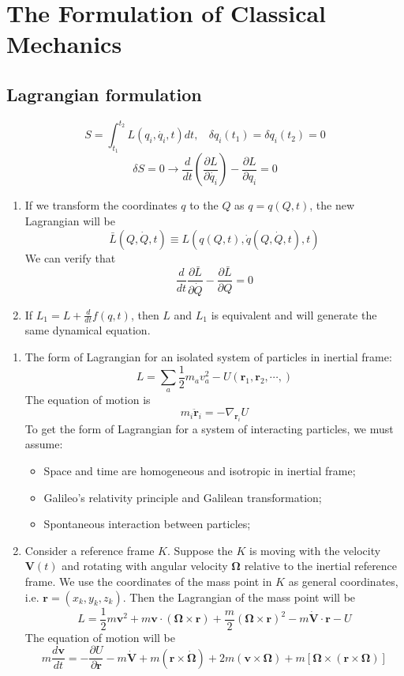 \chapter{The Formulation of Classical Mechanics}
\section{Lagrangian formulation}
\[S=\int_{t_1}^{t_2}L(q_i,\dot{q_i},t)dt, \ \ \ \ \delta q_i(t_1) = \delta q_i(t_2) = 0\]
\[\delta S=0 \rightarrow \frac{d}{dt}(\frac{\partial L}{\partial \dot{q_i}}) - \frac{\partial L}{\partial q_i}=0\]

\begin{enumerate}
\item If we transform the coordinates $q$ to the $Q$ as $q = q(Q,t)$, the new Lagrangian will be
\[\bar{L}(Q,\dot{Q},t) \equiv L(q(Q,t),\dot{q}(Q,\dot{Q},t),t)\]
We can verify that
\[\frac{d}{dt}\frac{\partial \bar{L}}{\partial \dot{Q}} - \frac{\partial \bar{L}}{\partial Q} = 0\]
\item If $L_1 = L + \frac{d}{dt} f(q,t)$, then $L$ and $L_1$ is equivalent and will generate the same dynamical equation.
\end{enumerate}

\begin{example}
\begin{enumerate}
\item The form of Lagrangian for an isolated system of particles in inertial frame:
\[L=\sum_a \frac{1}{2}m_a v_a^2 -U(\bm{r}_1,\bm{r}_2,\cdots,)\]
The equation of motion is
\[m_i \ddot{\bm{r}}_i = -\nabla_{\bm{r}_i} U\]
To get the form of Lagrangian for a system of interacting particles, we must assume:
\begin{itemize}
\item Space and time are homogeneous and isotropic in inertial frame;
\item Galileo's relativity principle and Galilean transformation;
\item Spontaneous interaction between particles;
\end{itemize}
\item Consider a reference frame $K$. Suppose the $K$ is moving with the velocity $\bm{V}(t)$ and  rotating with angular velocity $\bm{\Omega}$  relative to the inertial reference frame. We use the coordinates of the mass point in $K$ as general coordinates, i.e. $\bm{r} = (x_k,y_k,z_k)$. Then the Lagrangian of the mass point will be
\[L = \frac{1}{2}m\bm{v}^2 + m\bm{v}\cdot(\bm{\Omega}\times\bm{r})+\frac{m}{2}(\bm{\Omega}\times\bm{r})^2 - m\dot{\bm{V}}\cdot\bm{r}-U\]
The equation of motion will be
\[m\frac{d\bm{v}}{dt} = -\frac{\partial U}{\partial \bm{r}} - m\dot{\bm{V}} + m(\bm{r} \times \dot{\bm{\Omega}}) + 2m(\bm{v} \times \bm{\Omega}) + m[\bm{\Omega}\times(\bm{r} \times \bm{\Omega})]\]
\end{enumerate}
\end{example}

